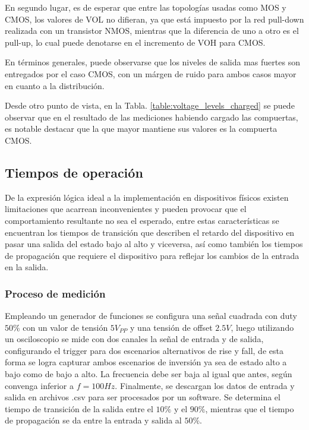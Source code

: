 En segundo lugar, es de esperar que entre las topolog\'ias usadas como MOS y CMOS, los valores de VOL no difieran, ya que est\'a impuesto por la red pull-down realizada con un transistor NMOS,
mientras que la diferencia de uno a otro es el pull-up, lo cual puede denotarse en el incremento de VOH para CMOS.

En t\'erminos generales, puede observarse que los niveles de salida mas fuertes son entregados por el caso CMOS, con un m\'argen de ruido para ambos casos mayor en cuanto a la distribuci\'on.


Desde otro punto de vista, en la Tabla. \ref{table:voltage_levels_charged} se puede observar que en el resultado de las mediciones habiendo cargado las compuertas, es notable destacar que la que mayor mantiene sus valores
es la compuerta CMOS.

\subsection{Tiempos de operaci\'on}
De la expresi\'on l\'ogica ideal a la implementaci\'on en dispositivos f\'isicos existen limitaciones que acarrean inconvenientes y pueden provocar que el comportamiento
resultante no sea el esperado, entre estas caracter\'isticas se encuentran los tiempos de transici\'on que describen el retardo del dispositivo en pasar una salida del estado bajo al alto y viceversa, as\'i como tambi\'en los tiempos
de propagaci\'on que requiere el dispositivo para reflejar los cambios de la entrada en la salida.

\subsubsection{Proceso de medici\'on}
Empleando un generador de funciones se configura una se\~nal cuadrada con duty $50\%$ con un valor de tensi\'on $5 V_{PP}$ y una tensi\'on de offset $2.5V$, luego utilizando un osciloscopio se mide con dos canales
la se\~nal de entrada y de salida, configurando el trigger para dos escenarios alternativos de rise y fall, de esta forma se logra capturar ambos escenarios de inversi\'on ya sea de estado alto a bajo como de bajo a alto. La frecuencia debe ser baja al igual que antes,
seg\'un convenga inferior a $f = 100Hz$.
Finalmente, se descargan los datos de entrada y salida en archivos .csv para ser procesados por un software. Se determina el tiempo de transici\'on de la salida entre el $10\%$ y el $90\%$, mientras que el tiempo de propagaci\'on se da entre la entrada y salida al $50\%$.

